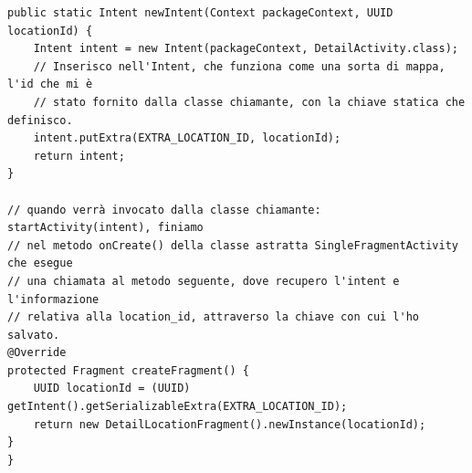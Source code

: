 \documentclass{article}
\begin{document}
\begin{itemize}
\begin{lstlisting}
public static Intent newIntent(Context packageContext, UUID locationId) {
    Intent intent = new Intent(packageContext, DetailActivity.class);
    // Inserisco nell'Intent, che funziona come una sorta di mappa, l'id che mi è
    // stato fornito dalla classe chiamante, con la chiave statica che definisco.
    intent.putExtra(EXTRA_LOCATION_ID, locationId);
    return intent;
}

// quando verrà invocato dalla classe chiamante: startActivity(intent), finiamo
// nel metodo onCreate() della classe astratta SingleFragmentActivity che esegue
// una chiamata al metodo seguente, dove recupero l'intent e l'informazione
// relativa alla location_id, attraverso la chiave con cui l'ho salvato.
@Override
protected Fragment createFragment() {
    UUID locationId = (UUID) getIntent().getSerializableExtra(EXTRA_LOCATION_ID);
    return new DetailLocationFragment().newInstance(locationId);
}
}
    \end{lstlisting}
\end{itemize}
\end{document}
